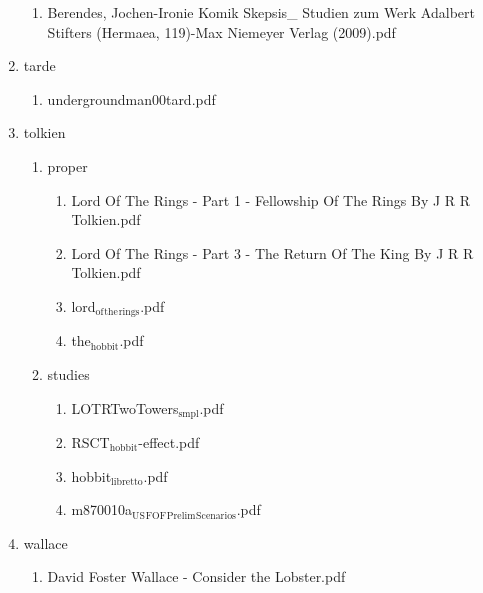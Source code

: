 \documentclass[11pt]{article}
\begin{document}
\begin{enumerate}
\begin{enumerate}
\item Berendes, Jochen-Ironie  Komik  Skepsis\_ Studien zum Werk Adalbert Stifters (Hermaea, 119)-Max Niemeyer Verlag (2009).pdf
\label{sec-1-1-1-1-28-31-2}
\end{enumerate}

\item tarde
\label{sec-1-1-1-1-28-32}
\begin{enumerate}
\item undergroundman00tard.pdf
\label{sec-1-1-1-1-28-32-1}
\end{enumerate}

\item tolkien
\label{sec-1-1-1-1-28-33}
\begin{enumerate}
\item proper
\label{sec-1-1-1-1-28-33-1}
\begin{enumerate}
\item Lord Of The Rings - Part 1 - Fellowship Of The Rings By J R R Tolkien.pdf
\label{sec-1-1-1-1-28-33-1-1}

\item Lord Of The Rings - Part 3 - The Return Of The King By J R R Tolkien.pdf
\label{sec-1-1-1-1-28-33-1-2}

\item lord$_{\text{of}}$$_{\text{the}}$$_{\text{rings}}$.pdf
\label{sec-1-1-1-1-28-33-1-3}

\item the$_{\text{hobbit}}$.pdf
\label{sec-1-1-1-1-28-33-1-4}
\end{enumerate}

\item studies
\label{sec-1-1-1-1-28-33-2}
\begin{enumerate}
\item LOTRTwoTowers$_{\text{smpl}}$.pdf
\label{sec-1-1-1-1-28-33-2-1}

\item RSCT$_{\text{hobbit}}$-effect.pdf
\label{sec-1-1-1-1-28-33-2-2}

\item hobbit$_{\text{libretto}}$.pdf
\label{sec-1-1-1-1-28-33-2-3}

\item m870010a$_{\text{US}}$$_{\text{FOF}}$$_{\text{Prelim}}$$_{\text{Scenarios}}$.pdf
\label{sec-1-1-1-1-28-33-2-4}
\end{enumerate}
\end{enumerate}

\item wallace
\label{sec-1-1-1-1-28-34}
\begin{enumerate}
\item David Foster Wallace - Consider the Lobster.pdf
\label{sec-1-1-1-1-28-34-1}


\end{enumerate}
\end{enumerate}
\end{document}

